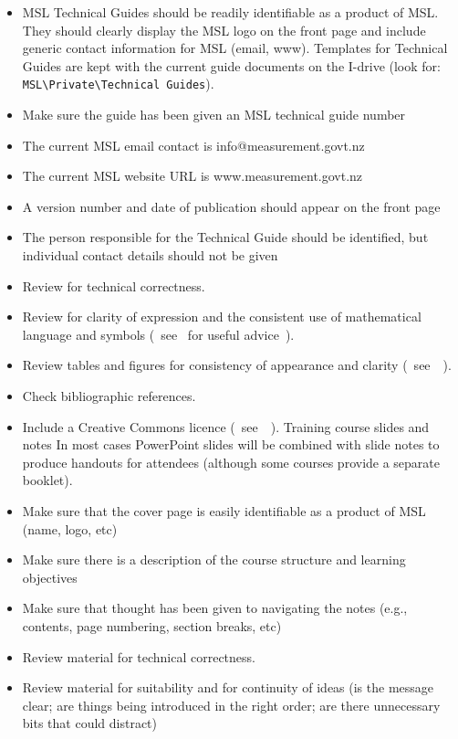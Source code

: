 \begin{itemize}
\item MSL Technical Guides should be readily identifiable as a product of MSL. They should clearly display the MSL logo on the front page and include generic contact information for MSL (email, www). Templates for Technical Guides are kept with the current guide documents on the I-drive (look for: 
\verb|MSL\Private\Technical Guides|).
\item  Make sure the guide has been given an MSL technical guide number
\item  The current MSL email contact is info@measurement.govt.nz
\item  The current MSL website URL is www.measurement.govt.nz
\item   A version number and date of publication should appear on the front page
\item  The person responsible for the Technical Guide should be identified, but individual contact details should not be given
\item  Review for technical correctness.
\item  Review for clarity of expression and the consistent use of mathematical language and symbols (~see~\cite{MSL_Reporting_Guidelines} for useful advice~).
\item  Review tables and figures for consistency of appearance and clarity (~see~\cite{MSL_Reporting_Guidelines}~).
\item  Check bibliographic references. 
\item  Include a Creative Commons licence (~see~\cite{MSL_Reporting_Guidelines}~).
 Training course slides and notes
In most cases PowerPoint slides will be combined with slide notes to produce handouts for attendees (although some courses provide a separate booklet). 
\item  Make sure that the cover page is easily identifiable as a product of MSL (name, logo, etc)
\item  Make sure there is a description of the course structure and learning objectives
\item  Make sure that thought has been given to navigating the notes (e.g., contents, page numbering, section breaks, etc) 
\item  Review material for technical correctness.
\item  Review material for suitability and for continuity of ideas (is the message clear; are things being introduced in the right order; are there unnecessary bits that could distract)

\end{itemize}
